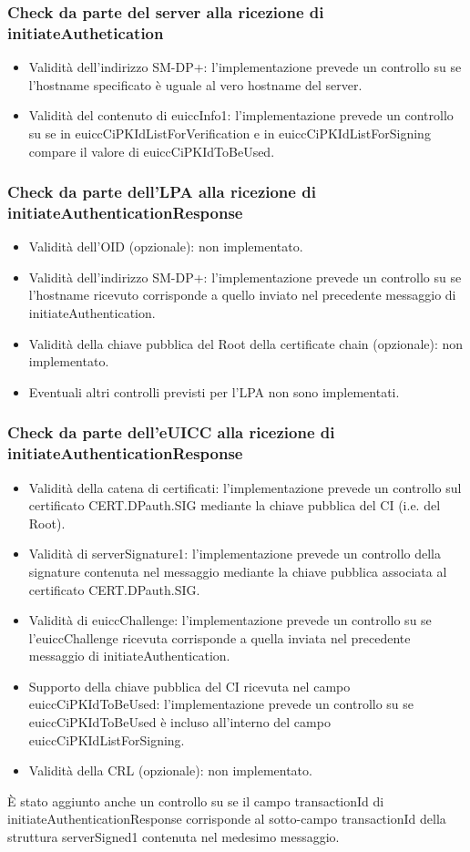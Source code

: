 \documentclass[10pt, oneside]{book}
\begin{document}
\subsubsection{Check da parte del server alla ricezione di initiateAuthetication}
\begin{itemize}
\item Validità dell'indirizzo SM-DP+: l'implementazione prevede un controllo su se l'hostname specificato è uguale al vero hostname del server.
\item Validità del contenuto di euiccInfo1: l'implementazione prevede un controllo su se in euiccCiPKIdListForVerification e in euiccCiPKIdListForSigning compare il valore di euiccCiPKIdToBeUsed.
\end{itemize}

\subsubsection{Check da parte dell'LPA alla ricezione di initiateAuthenticationResponse}
\begin{itemize}
\item Validità dell'OID (opzionale): non implementato.
\item Validità dell'indirizzo SM-DP+: l'implementazione prevede un controllo su se l'hostname ricevuto corrisponde a quello inviato nel precedente messaggio di initiateAuthentication.
\item Validità della chiave pubblica del Root della certificate chain (opzionale): non implementato.
\item Eventuali altri controlli previsti per l'LPA non sono implementati.
\end{itemize}

\subsubsection{Check da parte dell'eUICC alla ricezione di initiateAuthenticationResponse}
\begin{itemize}
\item Validità della catena di certificati: l'implementazione prevede un controllo sul certificato CERT.DPauth.SIG mediante la chiave pubblica del CI (i.e. del Root).
\item Validità di serverSignature1: l'implementazione prevede un controllo della signature contenuta nel messaggio mediante la chiave pubblica associata al certificato CERT.DPauth.SIG.
\item Validità di euiccChallenge: l'implementazione prevede un controllo su se l'euiccChallenge ricevuta corrisponde a quella inviata nel precedente messaggio di initiateAuthentication.
\item Supporto della chiave pubblica del CI ricevuta nel campo euiccCiPKIdToBeUsed: l'implementazione prevede un controllo su se euiccCiPKIdToBeUsed è incluso all'interno del campo euiccCiPKIdListForSigning.
\item Validità della CRL (opzionale): non implementato.
\end{itemize}
È stato aggiunto anche un controllo su se il campo transactionId di initiateAuthenticationResponse corrisponde al sotto-campo transactionId della struttura serverSigned1 contenuta nel medesimo messaggio.
\end{document}
